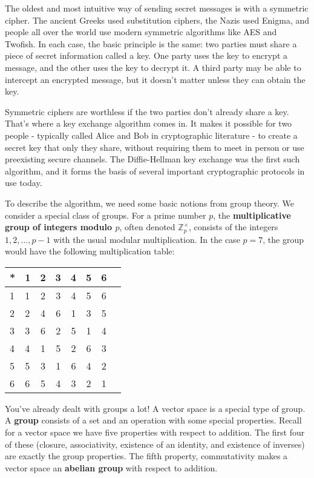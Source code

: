 
The oldest and most intuitive way of sending secret messages is with a symmetric cipher. The ancient Greeks used substitution ciphers, the Nazis used Enigma, and people all over the world use modern symmetric algorithms like AES and Twofish. In each case, the basic principle is the same: two parties must share a piece of secret information called a key. One party uses the key to encrypt a message, and the other uses the key to decrypt it. A third party may be able to intercept an encrypted message, but it doesn't matter unless they can obtain the key.

Symmetric ciphers are worthless if the two parties don't already share a key. That's where a key exchange algorithm comes in. It makes it possible for two people - typically called Alice and Bob in cryptographic literature - to create a secret key that only they share, without requiring them to meet in person or use preexisting secure channels. The Diffie-Hellman key exchange was the first such algorithm, and it forms the basis of several important cryptographic protocols in use today.

To describe the algorithm, we need some basic notions from group theory. We consider a special class of groups. For a prime number $p$, the {\bf multiplicative group of integers modulo $p$}, often denoted $\mathbb{Z}_p^\times$, consists of the integers $1, 2, \dots, p-1$ with the usual modular multiplication. In the case $p=7$, the group would have the following multiplication table:

\begin{center}
\begin{tabular}{l | l*{6}{c}}
* & 1 & 2 & 3 & 4 & 5 & 6 \\
\hline
1 & 1 & 2 & 3 & 4 & 5 & 6 \\
2 & 2 & 4 & 6 & 1 & 3 & 5 \\
3 & 3 & 6 & 2 & 5 & 1 & 4 \\
4 & 4 & 1 & 5 & 2 & 6 & 3 \\
5 & 5 & 3 & 1 & 6 & 4 & 2 \\
6 & 6 & 5 & 4 & 3 & 2 & 1 \\
\end{tabular}
\end{center}

\begin{info}
You've already dealt with groups a lot! A vector space is a special type of group. A {\bf group} consists of a set and an operation with some special properties. Recall for a vector space we have five properties with respect to addition. The first four of these (closure, associativity, existence of an identity, and existence of inverses) are exactly the group properties. The fifth property, commutativity makes a vector space an {\bf abelian group} with respect to addition.
\end{info}


